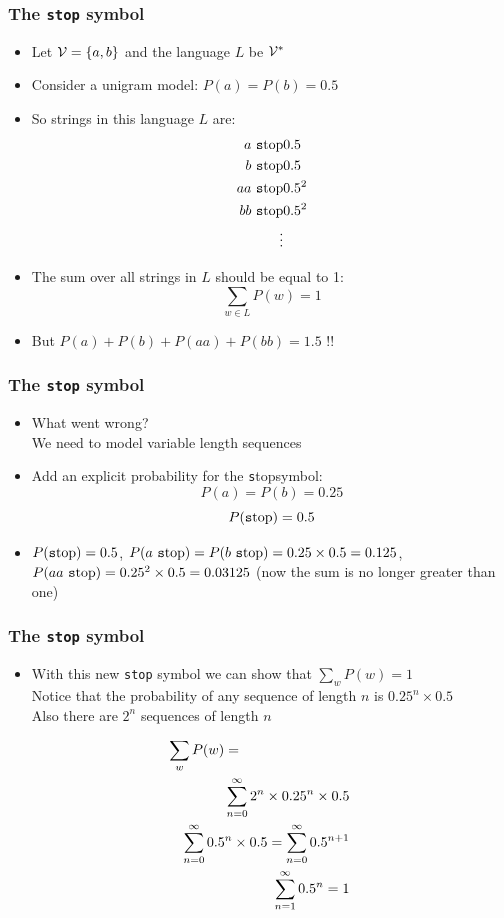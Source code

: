 \newcommand{\lmstop}{\mbox{\texttt stop}}

\begin{frame}
\frametitle{The {\tt stop} symbol}
\begin{itemize}[<+->]
\item Let ${\cal V} = \{ a, b \}$ and the language $L$ be ${\cal V}^\ast$
\item Consider a unigram model: $P(a) = P(b) = 0.5$
\item So strings in this language $L$ are:
\begin{eqnarray*}
a\ \lmstop & 0.5 \\
b\ \lmstop & 0.5 \\
aa\ \lmstop & 0.5^2 \\
bb\ \lmstop & 0.5^2 \\
\vdots
\end{eqnarray*}
\item The sum over all strings in $L$ should be equal to 1:
\[ \sum_{w \in L} P(w) = 1 \]
\item But $P(a) + P(b) + P(aa) + P(bb) = 1.5$ !! 
\end{itemize}
\end{frame}

\begin{frame}
\frametitle{The {\tt stop} symbol}
\begin{itemize}[<+->]
\item What went wrong? \\
We need to model variable length sequences
\item Add an explicit probability for the \lmstop symbol: 
\[ P(a) = P(b) = 0.25  \]
\[ P(\lmstop) = 0.5 \]
\item $P(\lmstop) = 0.5$, $P(a\ \lmstop) = P(b\ \lmstop) = 0.25 \times 0.5 = 0.125$, 
$P(aa\ \lmstop) = 0.25^2 \times 0.5 = 0.03125$ (now the sum is no longer greater than one)
\end{itemize}
\end{frame}

\begin{frame}
\frametitle{The {\tt stop} symbol}
\begin{itemize}[<+->]
\item With this new {\tt stop} symbol we can show that $\sum_w P(w) = 1$ \\
Notice that the probability of any sequence of length $n$ is $0.25^n \times 0.5$ \\
Also there are $2^n$ sequences of length $n$
\end{itemize}
\begin{eqnarray}
\lefteqn{\sum_w P(w) = } \nonumber \\
&& \sum_{n=0}^{\infty} 2^n \times 0.25^n \times 0.5 \nonumber \\
&& \sum_{n=0}^{\infty} 0.5^n \times 0.5 = \sum_{n=0}^{\infty} 0.5^{n+1} \nonumber \\
&& \sum_{n=1}^{\infty} 0.5^n = 1 \nonumber
\end{eqnarray}
\end{frame}




